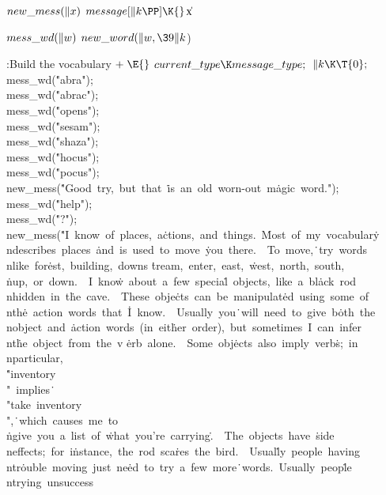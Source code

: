 \Y\B\4\D$\\{new\_mess}(\|x)$ \5
$\\{message}[\|k\PP]\K{}$\|x\par
\B\4\D$\\{mess\_wd}(\|w)$ \5
$\\{new\_word}(\|w,\39\|k{}$)\par
\Y\B\4:Build the vocabulary\X${}\mathrel+\E{}$\6
$\\{current\_type}\K\\{message\_type};{}$\6
${}\|k\K\T{0};{}$\6
\\{mess\_wd}(\.{"abra"});\6
\\{mess\_wd}(\.{"abrac"});\6
\\{mess\_wd}(\.{"opens"});\6
\\{mess\_wd}(\.{"sesam"});\6
\\{mess\_wd}(\.{"shaza"});\6
\\{mess\_wd}(\.{"hocus"});\6
\\{mess\_wd}(\.{"pocus"});\6
\\{new\_mess}(\.{"Good\ try,\ but\ that\ }\)\.{is\ an\ old\ worn-out\ m}\)\.{agic\ word."});\6
\\{mess\_wd}(\.{"help"});\6
\\{mess\_wd}(\.{"?"});\6
\\{new\_mess}(\.{"I\ know\ of\ places,\ a}\)\.{ctions,\ and\ things.\ }\)\.{Most\ of\ my\ vocabular}\)\.{y\\ndescribes\ places\ }\)\.{and\ is\ used\ to\ move\ }\)\.{you\ there.\ \ To\ move,}\)\.{\ try\ words\\nlike\ for}\)\.{est,\ building,\ downs}\)%
\.{tream,\ enter,\ east,\ }\)\.{west,\ north,\ south,\\}\)\.{nup,\ or\ down.\ \ I\ kno}\)\.{w\ about\ a\ few\ specia}\)\.{l\ objects,\ like\ a\ bl}\)\.{ack\ rod\\nhidden\ in\ t}\)\.{he\ cave.\ \ These\ obje}\)\.{cts\ can\ be\ manipulat}\)\.{ed\ using\
some\ of\\nth}\)\.{e\ action\ words\ that\ }\)\.{I\ know.\ \ Usually\ you}\)\.{\ will\ need\ to\ give\ b}\)\.{oth\ the\\nobject\ and\ }\)\.{action\ words\ (in\ eit}\)\.{her\ order),\ but\ some}\)\.{times\ I\ can\ infer\\nt}\)\.{he\ object\ from\ the\ v}%
\)\.{erb\ alone.\ \ Some\ obj}\)\.{ects\ also\ imply\ verb}\)\.{s;\ in\\nparticular,\ \\}\)\.{"inventory\\"\ implies}\)\.{\ \\"take\ inventory\\",}\)\.{\ which\ causes\ me\ to\\}\)\.{ngive\ you\ a\ list\ of\ }\)\.{what\ you're\ carrying}\)\.{.\ \ The\
objects\ have\ }\)\.{side\\neffects;\ for\ i}\)\.{nstance,\ the\ rod\ sca}\)\.{res\ the\ bird.\ \ Usual}\)\.{ly\ people\ having\\ntr}\)\.{ouble\ moving\ just\ ne}\)\.{ed\ to\ try\ a\ few\ more}\)\.{\ words.\ Usually\ peop}\)\.{le\\ntrying\ unsuccess}\)%
